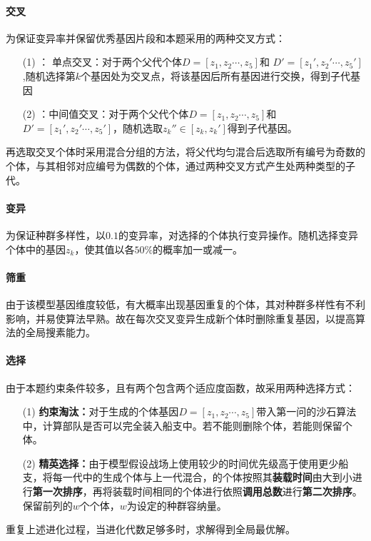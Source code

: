 \documentclass{whutmod}
\begin{document}
	 \paragraph{交叉}
	 为保证变异率并保留优秀基因片段和本题采用的两种交叉方式：
	\begin{itemize}
	\item [(1)]： 单点交叉：对于两个父代个体$D=[z_{1},z_{2}\cdots,z_{5}]$和	$D'=[z_{1}',z_{2}'\cdots,z_{5}']$,随机选择第$k$个基因处为交叉点，将该基因后所有基因进行交换，得到子代基因
	\item [(2)]：中间值交叉：对于两个父代个体$D=[z_{1},z_{2}\cdots,z_{5}]$和	$D'=[z_{1}',z_{2}'\cdots,z_{5}']$，随机选取$z_{k}''\in [z_{k},z_{k}']$得到子代基因。
    \end{itemize}
    再选取交叉个体时采用混合分组的方法，将父代均匀混合后选取所有编号为奇数的个体，与其相邻对应编号为偶数的个体，通过两种交叉方式产生处两种类型的子代。
     \paragraph{变异}
     为保证种群多样性，以$0.1$的变异率，对选择的个体执行变异操作。随机选择变异个体中的基因$z_{k}$，使其值以各$50\%$的概率加一或减一。
     \paragraph{筛重}
     由于该模型基因维度较低，有大概率出现基因重复的个体，其对种群多样性有不利影响，并易使算法早熟。故在每次交叉变异生成新个体时删除重复基因，以提高算法的全局搜素能力。
     \paragraph{选择}
     由于本题约束条件较多，且有两个包含两个适应度函数，故采用两种选择方式：
     \begin{itemize}
     \item [(1)] \textbf{约束淘汰：}对于生成的个体基因$D=[z_{1},z_{2}\cdots,z_{5}]$带入第一问的沙石算法中，计算部队是否可以完全装入船支中。若不能则删除个体，若能则保留个体。
     \item [(2)]\textbf{精英选择：}由于模型假设战场上使用较少的时间优先级高于使用更少船支，将每一代中的生成个体与上一代混合，的个体按照其\textbf{装载时间}由大到小进行\textbf{第一次排序}，再将装载时间相同的个体进行依照\textbf{调用总数}进行\textbf{第二次排序}。保留前列的$w$个个体，$w$为设定的种群容纳量。
     \end{itemize}
     重复上述进化过程，当进化代数足够多时，求解得到全局最优解。
\end{document}
